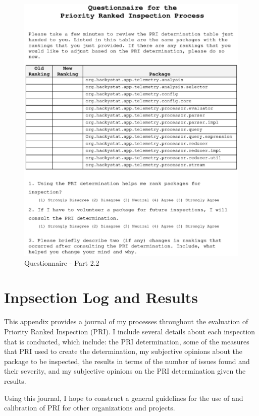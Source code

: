 \begin{figure}[htbp]
  \centering
  \includegraphics[width=1.0\textwidth]{figs/hackyTelemetry-questionnaire-shrunk_2.eps}
  \caption{Questionnaire - Part 2.2}
  \label{fig:questionnaire2.2}
\end{figure}


\chapter{Inpsection Log and Results}
\label{appendix:log}
This appendix provides a journal of my processes throughout the evaluation
of Priority Ranked Inspection (PRI). I include several details about each
inspection that is conducted, which include: the PRI determination, some of 
the measures that PRI used to create the determination, my subjective
opinions about the package to be inspected, the results in terms of the
number of issues found and their severity, and my subjective opinions on
the PRI determination given the results.

Using this journal, I hope to construct a general guidelines for the use of
and calibration of PRI for other organizations and projects.

